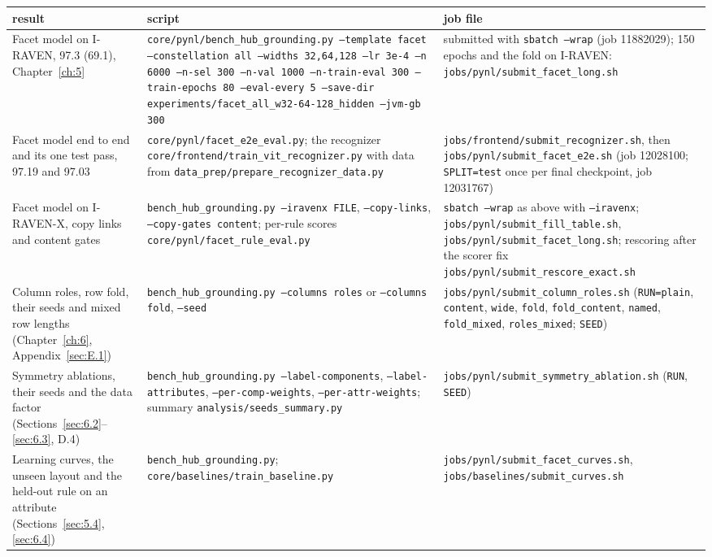 {\small
\begin{xltabular}{\linewidth}{@{}YYY@{}}
\toprule
result & script & job file \\
\midrule
\endhead
Facet model on I-RAVEN, 97.3 (69.1), Chapter~\ref{ch:5} & \texttt{core/pynl/bench\_hub\_grounding.py --template facet --constellation all --widths 32,64,128 --lr 3e-4 --n 6000 --n-sel 300 --n-val 1000 --n-train-eval 300 --train-epochs 80 --eval-every 5 --save-dir experiments/facet\_all\_w32-64-128\_hidden --jvm-gb 300} & submitted with \texttt{sbatch --wrap} (job 11882029); 150 epochs and the fold on I-RAVEN: \texttt{jobs/pynl/submit\_facet\_long.sh} \\
Facet model end to end and its one test pass, 97.19 and 97.03 & \texttt{core/pynl/facet\_e2e\_eval.py}; the recognizer \texttt{core/frontend/train\_vit\_recognizer.py} with data from \texttt{data\_prep/prepare\_recognizer\_data.py} & \texttt{jobs/frontend/submit\_recognizer.sh}, then \texttt{jobs/pynl/submit\_facet\_e2e.sh} (job 12028100; \texttt{SPLIT=test} once per final checkpoint, job 12031767) \\
Facet model on I-RAVEN-X, copy links and content gates & \texttt{bench\_hub\_grounding.py --iravenx FILE}, \texttt{--copy-links}, \texttt{--copy-gates content}; per-rule scores \texttt{core/pynl/facet\_rule\_eval.py} & \texttt{sbatch --wrap} as above with \texttt{--iravenx}; \texttt{jobs/pynl/submit\_fill\_table.sh}, \texttt{jobs/pynl/submit\_facet\_long.sh}; rescoring after the scorer fix \texttt{jobs/pynl/submit\_rescore\_exact.sh} \\
Column roles, row fold, their seeds and mixed row lengths (Chapter~\ref{ch:6}, Appendix~\ref{sec:E.1}) & \texttt{bench\_hub\_grounding.py --columns roles} or \texttt{--columns fold}, \texttt{--seed} & \texttt{jobs/pynl/submit\_column\_roles.sh} (\texttt{RUN=plain}, \texttt{content}, \texttt{wide}, \texttt{fold}, \texttt{fold\_content}, \texttt{named}, \texttt{fold\_mixed}, \texttt{roles\_mixed}; \texttt{SEED}) \\
Symmetry ablations, their seeds and the data factor (Sections~\ref{sec:6.2}–\ref{sec:6.3}, D.4) & \texttt{bench\_hub\_grounding.py --label-components}, \texttt{--label-attributes}, \texttt{--per-comp-weights}, \texttt{--per-attr-weights}; summary \texttt{analysis/seeds\_summary.py} & \texttt{jobs/pynl/submit\_symmetry\_ablation.sh} (\texttt{RUN}, \texttt{SEED}) \\
Learning curves, the unseen layout and the held-out rule on an attribute (Sections~\ref{sec:5.4}, \ref{sec:6.4}) & \texttt{bench\_hub\_grounding.py}; \texttt{core/baselines/train\_baseline.py} & \texttt{jobs/pynl/submit\_facet\_curves.sh}, \texttt{jobs/baselines/submit\_curves.sh} \\

\end{xltabular}}
